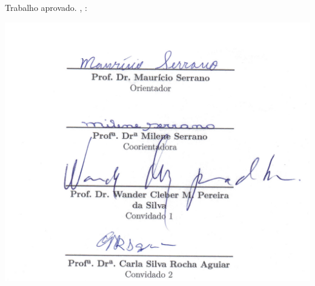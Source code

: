 \begin{folhadeaprovacao}
  \begin{center}
    {\ABNTEXchapterfont\large\imprimirautor}

    \vspace*{\fill}\vspace*{\fill}
    {\ABNTEXchapterfont\bfseries\Large\imprimirtitulo}
    \vspace*{\fill}
    
    \hspace{.45\textwidth}
    \begin{minipage}{.5\textwidth}
        \imprimirpreambulo
    \end{minipage}%
    \vspace*{\fill}
   \end{center}
    
   Trabalho aprovado. \imprimirlocal, \imprimirdatadaaprovacao:


   \includegraphics[scale=0.23]{figuras/aprovacao}    
      
   \begin{center}
    \vspace*{0.5cm}
    {\large\imprimirlocal}
    \par
    {\large\imprimirdata}
    \vspace*{1cm}
  \end{center}  
\end{folhadeaprovacao}
